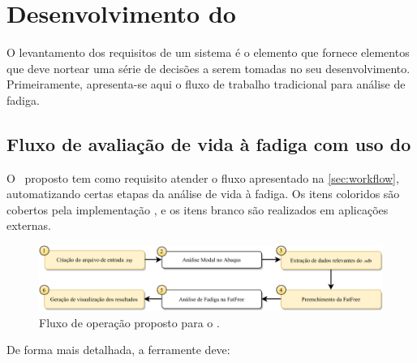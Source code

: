 \chapter{Desenvolvimento do \frame}\label{chap:software}

O levantamento dos requisitos de um sistema é o elemento que fornece elementos que deve nortear uma série de decisões a serem tomadas no seu desenvolvimento. Primeiramente, apresenta-se aqui o fluxo de trabalho tradicional para análise de fadiga.




\section{Fluxo de avaliação de vida à fadiga com uso do \frame}


O \frame\ proposto tem como requisito atender o fluxo apresentado na \autoref{sec:workflow}, automatizando certas etapas da análise de vida à fadiga. Os itens coloridos são cobertos pela implementação \frame, e os itens  branco são realizados em aplicações externas.


\begin{figure}[!ht]
    \centering
    \caption{Fluxo de operação proposto para o \frame.}\label{fig:workflow}
    \includegraphics[width=\textwidth]{imagens/fluxograma_automatizado}
\end{figure}

De forma mais detalhada, a ferramente deve:

